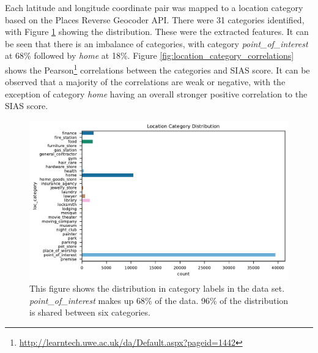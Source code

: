 \documentclass{l4proj}
\begin{document}
Each latitude and longitude coordinate pair was mapped to a location category based on the Places Reverse Geocoder API. There were 31 categories identified, with Figure \ref{fig:location_category_distribution} showing the distribution. These were the extracted features. It can be seen that there is an imbalance of categories, with category \textit{point\_of\_interest} at 68\% followed by \textit{home} at 18\%. Figure \ref{fig:location_category_correlations} shows the Pearson\footnote{\url{http://learntech.uwe.ac.uk/da/Default.aspx?pageid=1442}} correlations between the categories and SIAS score. It can be observed that a majority of the correlations are weak or negative, with the exception of category \textit{home} having an overall stronger positive correlation to the SIAS score.

\begin{figure}[htb]
    \centering
    \includegraphics[width=\linewidth]{images/location/bar_chart_Location_Category_Distribution.pdf}
    \caption{This figure shows the distribution in category labels in the data set. \textit{point\_of\_interest} makes up 68\% of the data. 96\% of the distribution is shared between six categories.}
    \label{fig:location_category_distribution} 
\end{figure}


\end{document}
